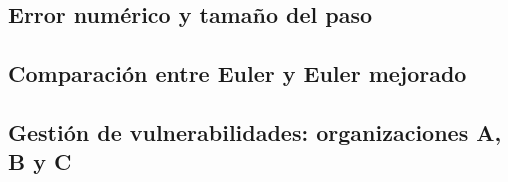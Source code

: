 \documentclass[11pt,a4paper]{article}
\begin{document}


\subsection{Error numérico y tamaño del paso}


% 


\subsection{Comparación entre Euler y Euler mejorado}


% 

\subsection{Gestión de vulnerabilidades: organizaciones A, B y C}

\end{document}
